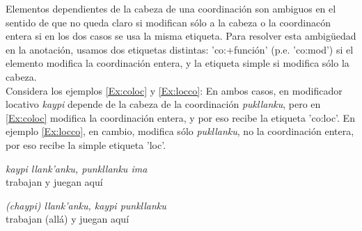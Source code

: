 \documentclass[a4paper,11pt,DIV12]{scrartcl}
\begin{document}
Elementos dependientes de la cabeza de una coordinaci\'on son ambiguos en el sentido de que no queda claro si modifican s\'olo a la cabeza o la coordinac\'on entera si en los dos casos se usa la misma etiqueta. Para resolver esta ambig\"uedad en la anotaci\'on, usamos dos etiquetas distintas: 'co:+funci\'on' (p.e. 'co:mod') si el elemento modifica la coordinaci\'on entera, y la etiqueta simple si modifica s\'olo la cabeza.\\
Considera los ejemplos \ref{Ex:coloc} y \ref{Ex:locco}: En ambos casos, en modificador locativo {\em kaypi} depende de la cabeza de la coordinaci\'on {\em pukllanku}, pero en \ref{Ex:coloc} modifica la coordinaci\'on entera, y por eso recibe la etiqueta 'co:loc'. En ejemplo \ref{Ex:locco}, en cambio, modifica s\'olo {\em pukllanku}, no la coordinaci\'on entera, por eso recibe la simple etiqueta 'loc'.
\begin{center}
 \begin{minipage}{0.4\textwidth}
 \begin{examples}
 \item\label{Ex:coloc} {\em kaypi llank'anku, punkllanku ima}\\
      trabajan y juegan aqu\'i
  \item\label{Ex:locco} {\em (chaypi) llank'anku,  kaypi punkllanku}\\
      trabajan (all\'a) y juegan aqu\'i
\end{examples}
\end{minipage}
\hfill
\begin{minipage}{0.5\textwidth}
\begin{center}
\end{center}
\end{minipage}
\end{center}
\end{document}
